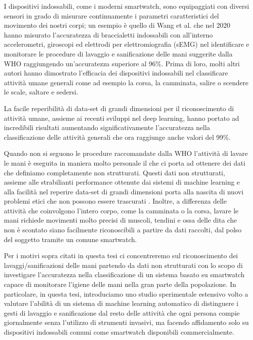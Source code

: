 I dispositivi indossabili, come i moderni smartwatch, sono equipaggiati con diversi sensori in grado di misurare continuamente i parametri caratteristici del movimento dei nostri corpi; un 
esempio è quello di Wang et al.\cite{wang2020accurate} che nel 2020 hanno misurato l'accuratezza di braccialetti indossabili con all'interno accelerometri, giroscopi ed elettrodi per elettromiografia (sEMG) nel 
identificare e monitorare le procedure di lavaggio e sanificazione delle mani suggerite dalla WHO raggiungendo un'accuratezza superiore al 96\%.
Prima di loro, molti altri autori hanno dimostrato l'efficacia dei dispositivi indossabili nel classificare attività umane generali come ad esempio la corsa, la camminata, salire o scendere le 
scale, saltare e sedersi\cite{zhang2013human}\cite{sztyler2016body}\cite{sztyler2017position}\cite{bhat2018online}\cite{koping2018general}\cite{lattanzi2022exploring}.

La facile reperibilità di data-set di grandi dimensioni per il riconoscimento di attività umane, assieme ai recenti sviluppi nel deep learning, hanno portato ad incredibili risultati aumentando 
significativamente l'accuratezza nella classificazione delle attività generali che ora raggiunge anche valori del 99\%\cite{cheng2010active}\cite{singh2017convolutional}\cite{hassan2018robust}\cite{hou2020study}.

Quando non si seguono le procedure raccomandate dalla WHO l'attività di lavare le mani è eseguita in maniera molto personale il che ci porta ad ottenere dei dati che definiamo completamente non strutturati.
Questi dati non strutturati, assieme alle strabilianti performance ottenute dai sistemi di machine learning e alla facilità nel reperire data-set di grandi dimensioni porta alla nascita di nuovi problemi
etici che non possono essere trascurati \cite{muller2021ten}. Inoltre, a differenza delle attività che coinvolgono l'intero corpo, come la camminata o la corsa, lavare le mani richiede movimenti molto precisi 
di muscoli, tendini e ossa delle dita che non è scontato siano facilmente riconoscibili a partire da dati raccolti, dal polso del soggetto tramite un comune smartwatch. 

Per i motivi sopra citati in questa tesi ci concentreremo sul riconoscimento dei lavaggi/sanificazioni delle mani partendo da dati non strutturati con lo scopo di investigare l'accuratezza nella 
classificazione di un sistema basato su smartwatch capace di monitorare l'igiene delle mani nella gran parte della popolazione. In particolare, in questa tesi, introduciamo uno studio sperimentale 
estensivo volto a valutare l'abilità di un sistema di machine learning automatico di distinguere i gesti di lavaggio e sanificazione dal resto delle attività che ogni persona compie giornalmente 
senza l'utilizzo di strumenti invasivi, ma facendo affidamento solo su dispositivi indossabili comuni come smartwatch disponibili commercialmente.

